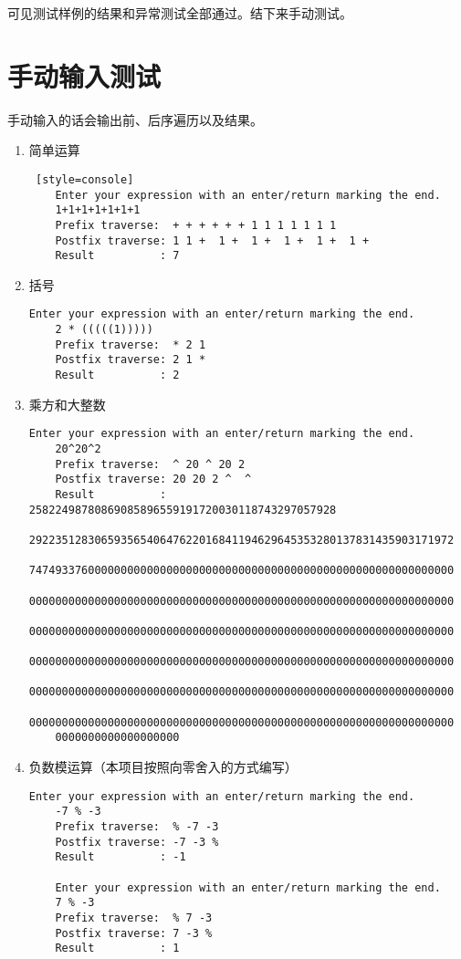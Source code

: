 可见测试样例的结果和异常测试全部通过。结下来手动测试。

\section{手动输入测试}
手动输入的话会输出前、后序遍历以及结果。

\begin{enumerate}
    \item 简单运算
\begin{lstlisting} [style=console]
    Enter your expression with an enter/return marking the end.
    1+1+1+1+1+1+1
    Prefix traverse:  + + + + + + 1 1 1 1 1 1 1
    Postfix traverse: 1 1 +  1 +  1 +  1 +  1 +  1 + 
    Result          : 7
\end{lstlisting}

    \item 括号
\begin{lstlisting}[style=console]
    Enter your expression with an enter/return marking the end.
    2 * (((((1)))))
    Prefix traverse:  * 2 1
    Postfix traverse: 2 1 * 
    Result          : 2
\end{lstlisting}

    \item 乘方和大整数
\begin{lstlisting}[style=console]
    Enter your expression with an enter/return marking the end.
    20^20^2
    Prefix traverse:  ^ 20 ^ 20 2
    Postfix traverse: 20 20 2 ^  ^ 
    Result          : 25822498780869085896559191720030118743297057928
    29223512830659356540647622016841194629645353280137831435903171972
    74749337600000000000000000000000000000000000000000000000000000000
    00000000000000000000000000000000000000000000000000000000000000000
    00000000000000000000000000000000000000000000000000000000000000000
    00000000000000000000000000000000000000000000000000000000000000000
    00000000000000000000000000000000000000000000000000000000000000000
    00000000000000000000000000000000000000000000000000000000000000000
    0000000000000000000    
\end{lstlisting}

    \item 负数模运算（本项目按照向零舍入的方式编写）
\begin{lstlisting}[style=console]
    Enter your expression with an enter/return marking the end.
    -7 % -3
    Prefix traverse:  % -7 -3
    Postfix traverse: -7 -3 % 
    Result          : -1
    
    Enter your expression with an enter/return marking the end.
    7 % -3
    Prefix traverse:  % 7 -3
    Postfix traverse: 7 -3 % 
    Result          : 1
\end{lstlisting}


\end{enumerate}

